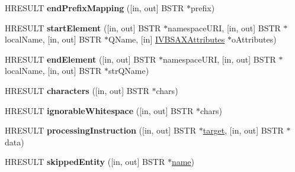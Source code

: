 \begin{DoxyCompactItemize}
H\+R\+E\+S\+U\+LT {\bfseries end\+Prefix\+Mapping} (\mbox{[}in, out\mbox{]} B\+S\+TR $\ast$prefix)
\item 
\mbox{\label{interface_m_s_x_m_l2_1_1_i_v_b_s_a_x_content_handler_a3db75f80da1c1de65facd33e078955ed}} 
H\+R\+E\+S\+U\+LT {\bfseries start\+Element} (\mbox{[}in, out\mbox{]} B\+S\+TR $\ast$namespace\+U\+RI, \mbox{[}in, out\mbox{]} B\+S\+TR $\ast$local\+Name, \mbox{[}in, out\mbox{]} B\+S\+TR $\ast$Q\+Name, \mbox{[}in\mbox{]} \hyperlink{interface_m_s_x_m_l2_1_1_i_v_b_s_a_x_attributes}{I\+V\+B\+S\+A\+X\+Attributes} $\ast$o\+Attributes)
\item 
\mbox{\label{interface_m_s_x_m_l2_1_1_i_v_b_s_a_x_content_handler_ad037e4ae64fa050242b3178395bc050d}} 
H\+R\+E\+S\+U\+LT {\bfseries end\+Element} (\mbox{[}in, out\mbox{]} B\+S\+TR $\ast$namespace\+U\+RI, \mbox{[}in, out\mbox{]} B\+S\+TR $\ast$local\+Name, \mbox{[}in, out\mbox{]} B\+S\+TR $\ast$str\+Q\+Name)
\item 
\mbox{\label{interface_m_s_x_m_l2_1_1_i_v_b_s_a_x_content_handler_a90bdf5ab404e5e47679c4d766538e28e}} 
H\+R\+E\+S\+U\+LT {\bfseries characters} (\mbox{[}in, out\mbox{]} B\+S\+TR $\ast$chars)
\item 
\mbox{\label{interface_m_s_x_m_l2_1_1_i_v_b_s_a_x_content_handler_a6f772025f033461add8d1f051302e598}} 
H\+R\+E\+S\+U\+LT {\bfseries ignorable\+Whitespace} (\mbox{[}in, out\mbox{]} B\+S\+TR $\ast$chars)
\item 
\mbox{\label{interface_m_s_x_m_l2_1_1_i_v_b_s_a_x_content_handler_aa61da9f3a6b8ba5e8aaa4f928bed0111}} 
H\+R\+E\+S\+U\+LT {\bfseries processing\+Instruction} (\mbox{[}in, out\mbox{]} B\+S\+TR $\ast$\hyperlink{interfacevoid}{target}, \mbox{[}in, out\mbox{]} B\+S\+TR $\ast$data)
\item 
\mbox{\label{interface_m_s_x_m_l2_1_1_i_v_b_s_a_x_content_handler_a27fd4e49c8f5f107f282586723985d69}} 
H\+R\+E\+S\+U\+LT {\bfseries skipped\+Entity} (\mbox{[}in, out\mbox{]} B\+S\+TR $\ast$\hyperlink{structname}{name})

\end{DoxyCompactItemize}
